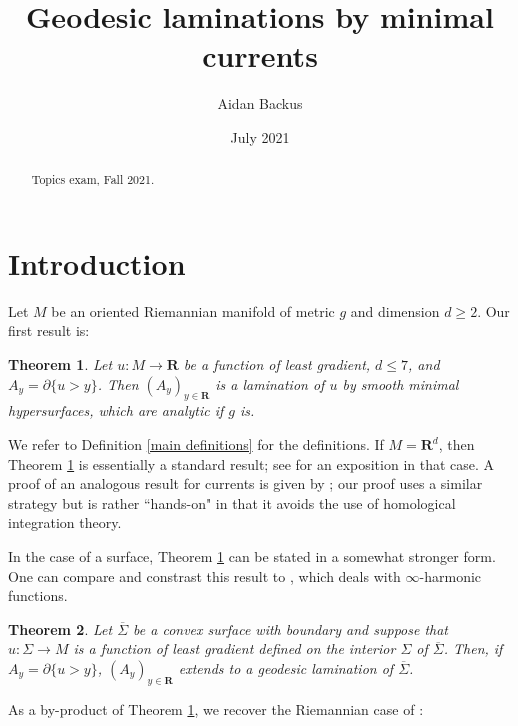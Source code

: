 \documentclass[reqno,12pt,letterpaper]{amsart}
\title[Geodesic laminations by minimal currents]{Geodesic laminations by minimal currents}
\author{Aidan Backus}
\date{July 2021}
\newcommand{\RR}{\mathbf{R}}
\newtheorem{theorem}{Theorem}[section]
\theoremstyle{definition}
\numberwithin{equation}{section}
\begin{document}
\begin{abstract}
Topics exam, Fall 2021.
\end{abstract}

\maketitle


\tableofcontents

\section{Introduction}
Let $M$ be an oriented Riemannian manifold of metric $g$ and dimension $d \geq 2$.
Our first result is:

\begin{theorem}\label{main thm}
Let $u: M \to \RR$ be a function of least gradient, $d \leq 7$, and $A_y = \partial \{u > y\}$.
Then $(A_y)_{y \in \RR}$ is a lamination of $u$ by smooth minimal hypersurfaces, which are analytic if $g$ is.
\end{theorem}

We refer to Definition \ref{main definitions} for the definitions.
If $M = \RR^d$, then Theorem \ref{main thm} is essentially a standard result; see \cite[Proposition 3.4]{górny2017planar} for an exposition in that case.
A proof of an analogous result for currents is given by \cite[\S5.3]{federer2014geometric}; our proof uses a similar strategy but is rather ``hands-on" in that it avoids the use of homological integration theory.

In the case of a surface, Theorem \ref{main thm} can be stated in a somewhat stronger form.
One can compare and constrast this result to \cite[Theorem 5.2]{daskalopoulos2020transverse}, which deals with $\infty$-harmonic functions.

\begin{theorem}\label{main crly}
Let $\overline \Sigma$ be a convex surface with boundary and suppose that $u: \Sigma \to M$ is a function of least gradient defined on the interior $\Sigma$ of $\overline \Sigma$.
Then, if $A_y = \partial \{u > y\}$, $(A_y)_{y \in \RR}$ extends to a geodesic lamination of $\overline \Sigma$.
\end{theorem}

As a by-product of Theorem \ref{main thm}, we recover the Riemannian case of \cite[Theorem 5.3.20]{federer2014geometric}:
\end{document}
